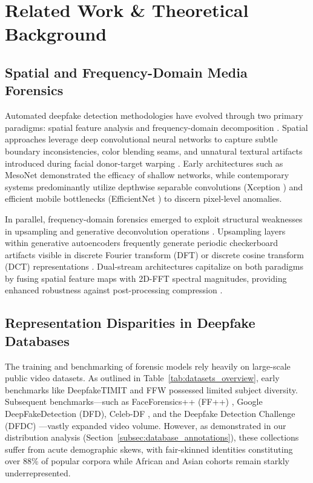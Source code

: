 \documentclass[journal]{IEEEtran}
\begin{document}
\section{Related Work \& Theoretical Background}
\label{sec:related_work}

\subsection{Spatial and Frequency-Domain Media Forensics}
Automated deepfake detection methodologies have evolved through two primary paradigms: spatial feature analysis and frequency-domain decomposition \cite{tolosana2020deepfakes}. Spatial approaches leverage deep convolutional neural networks to capture subtle boundary inconsistencies, color blending seams, and unnatural textural artifacts introduced during facial donor-target warping \cite{li2020facexray, chai2020makes}. Early architectures such as MesoNet \cite{afchar2018mesonet} demonstrated the efficacy of shallow networks, while contemporary systems predominantly utilize depthwise separable convolutions (Xception \cite{chollet2017xception}) and efficient mobile bottlenecks (EfficientNet \cite{tan2019efficientnet}) to discern pixel-level anomalies.

In parallel, frequency-domain forensics emerged to exploit structural weaknesses in upsampling and generative deconvolution operations \cite{qian2020thinking}. Upsampling layers within generative autoencoders frequently generate periodic checkerboard artifacts visible in discrete Fourier transform (DFT) or discrete cosine transform (DCT) representations \cite{durall2019unmasking}. Dual-stream architectures capitalize on both paradigms by fusing spatial feature maps with 2D-FFT spectral magnitudes, providing enhanced robustness against post-processing compression \cite{xu2022supervised}.

\subsection{Representation Disparities in Deepfake Databases}
The training and benchmarking of forensic models rely heavily on large-scale public video datasets. As outlined in Table~\ref{tab:datasets_overview}, early benchmarks like DeepfakeTIMIT \cite{korshunov2018deepfakes} and FFW \cite{khodabakhsh2018fake} possessed limited subject diversity. Subsequent benchmarks---such as FaceForensics++ (FF++) \cite{rossler2019faceforensics}, Google DeepFakeDetection (DFD), Celeb-DF \cite{li2020celebdf}, and the Deepfake Detection Challenge (DFDC) \cite{dolhansky2020deepfake}---vastly expanded video volume. However, as demonstrated in our distribution analysis (Section~\ref{subsec:database_annotations}), these collections suffer from acute demographic skews, with fair-skinned identities constituting over 88\% of popular corpora while African and Asian cohorts remain starkly underrepresented.
\end{document}
